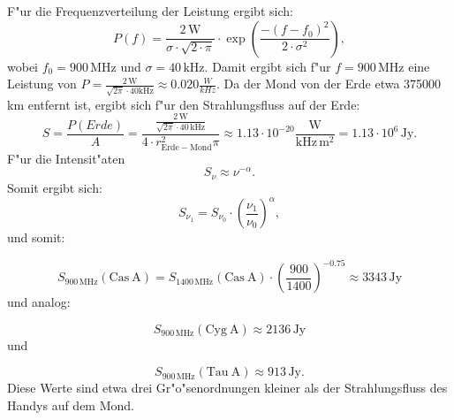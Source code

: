 \documentclass[titlepage]{scrartcl}
\begin{document}
F"ur die Frequenzverteilung der Leistung ergibt sich:
\begin{equation}
P(f) = \frac{2 \, \mathrm{W}}{\sigma \cdot \sqrt{2 \cdot \pi}} \cdot \exp\left({\frac{-(f-f_0)^2}{2 \cdot \sigma^2}}\right), 
\end{equation}
wobei $f_0 = 900\,  \mathrm{MHz}$ und $\sigma = 40\,  \mathrm{kHz}$. Damit ergibt sich f"ur $ f = 900\,  \mathrm{MHz} $ eine Leistung von $ P = \frac{2\,  \mathrm{W}}{\sqrt{2 \pi} \cdot 40 \mathrm{kHz}} \approx 0.020 \frac{W}{kHz}$. 
Da der Mond von der Erde etwa 375000 km entfernt ist, ergibt sich f"ur den Strahlungsfluss auf der Erde: 
\begin{equation}
S = \frac{P(Erde)}{A} = \frac{\frac{2\,  \mathrm{W}}{\sqrt{2 \pi} \cdot 40\,  \mathrm{kHz}}}{4 \cdot r_{\mathrm{Erde-Mond}}^2 \pi} \approx 1.13 \cdot 10^{-20} \frac{\mathrm{W}}{\mathrm{kHz}\,  \mathrm{m}^2} = 1.13 \cdot 10^6 \, \mathrm{Jy}. 
\end{equation}
F"ur die Intensit"aten 
\begin{equation}
S_{\nu} \approx \nu^{-\alpha}. 
\end{equation}
Somit ergibt sich: 
\begin{equation}
S_{\nu_1} = S_{\nu_0} \cdot (\frac{\nu_1}{\nu_0})^\alpha, 
\end{equation}
und somit:

\begin{equation}
S_{900 \, \mathrm{MHz}}(\mathrm{Cas\ A}) = S_{1400 \, \mathrm{MHz}}(\mathrm{Cas\ A}) \cdot \left(\frac{900}{1400}\right)^{-0.75} \approx 3343\,  \mathrm{Jy}
\end{equation} und analog:

\begin{equation}
S_{900 \, \mathrm{MHz}}(\mathrm{Cyg\ A}) \approx 2136\,  \mathrm{Jy}
\end{equation} und 

\begin{equation}
S_{900 \, \mathrm{MHz}}(\mathrm{Tau\ A}) \approx 913\, \mathrm{Jy}.
\end{equation}
Diese Werte sind etwa drei Gr"o"senordnungen kleiner als der Strahlungsfluss des Handys auf dem Mond. 
\end{document}
